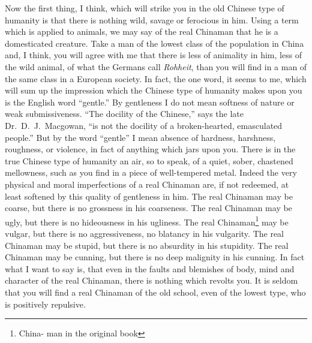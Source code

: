 Now the first thing, I think, which will strike you in the old Chinese type of humanity is that there is nothing wild, savage or ferocious in him.
Using a term which is applied to animals, we may say of the real Chinaman that he is a domesticated creature.
Take a man of the lowest class of the population in China and, I think, you will agree with me that there is less of animality in him, less of the wild animal, of what the Germans call \emph{Rohheit}, than you will find in a man of the same class in a European society.
In fact, the one word, it seems to me, which will sum up the impression which the Chinese type of humanity makes upon you is the English word ``gentle.''
By gentleness I do not mean softness of nature or weak submissiveness.
``The docility of the Chinese,'' says the late Dr.~D.~J.~Macgowan, ``is not the docility of a broken-hearted, emasculated people.''
But by the word ``gentle'' I mean absence of hardness, harshness, roughness, or violence, in fact of anything which jars upon you.
There is in the true Chinese type of humanity an air, so to speak, of a quiet, sober, chastened mellowness, such as you find in a piece of well-tempered metal.
Indeed the very physical and moral imperfections of a real Chinaman are, if not redeemed, at least softened by this quality of gentleness in him.
The real Chinaman may be coarse, but there is no grossness in his coarseness.
The real Chinaman may be ugly, but there is no hideousness in his ugliness.
The real Chinaman\footnote{China- man in the original book} may be vulgar, but there is no aggressiveness, no blatancy in his vulgarity.
The real Chinaman may be stupid, but there is no absurdity in his stupidity.
The real Chinaman may be cunning, but there is no deep malignity in his cunning.
In fact what I want to say is, that even in the faults and blemishes of body, mind and character of the real Chinaman, there is nothing which revolts you.
It is seldom that you will find a real Chinaman of the old school, even of the lowest type, who is positively repulsive.

